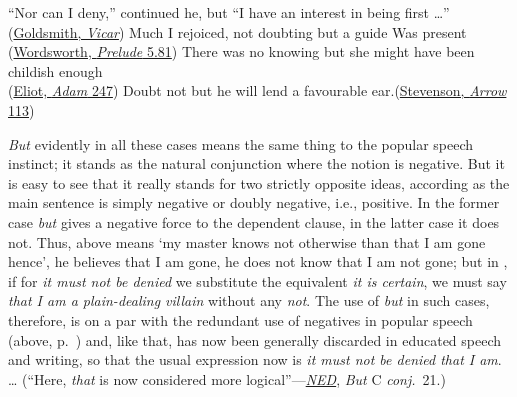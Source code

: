 \ex
``Nor can I deny,'' continued he, but ``I have an interest in being first \dots''\\\hfill(\href{https://archive.org/details/TheVicarOfWakefield/page/n111/mode/2up?q=%22can+I+deny%22&view=theater}{Goldsmith, \textit{Vicar}}) %
\ex
Much I rejoiced, not doubting but a guide Was present\\\hfill(\href{https://en.wikisource.org/wiki/Page%3AThe_Prelude%2C_Wordsworth%2C_1850.djvu/132}{Wordsworth, \textit{Prelude} 5.81})
\ex
There was no knowing but she might have been childish enough\\\hfill(\href{https://archive.org/details/adambede00eliouoft/page/n263/mode/2up?q=%22knowing+but+she+might%22&view=theater}{Eliot, \textit{Adam} 247})
\ex
Doubt not but he will lend a favourable ear.\hfill(\href{https://archive.org/details/blackarrowtaleof00stevrich/page/98/mode/2up?view=theater&q=%22doubt+not+but+he+will%22}{Stevenson, \textit{Arrow} 113})
\z
\z

\textit{But} evidently in all these cases means the same thing to the popular speech instinct; it stands as the natural conjunction where the notion is negative. But it is easy to see that it really stands for two strictly opposite ideas, according as the main sentence is simply negative or doubly negative, i.e., positive. In the former case \textit{but} gives a negative force to the dependent clause, in the latter case it does not. Thus,  above means `my master knows not otherwise than that I am gone hence', he believes that I am gone, he does not know that I am not gone; but in , if for \textit{it must not be denied} we substitute the equivalent \textit{it is certain}, we must say \textit{that I am a plain-dealing villain} without any \textit{not}. The use of \textit{but} in such cases, therefore, is on a par with the redundant use of negatives in popular speech (above, p.~\pageref{paratactic}) and, like that, has now been generally discarded in educated speech and writing, so that the usual expression now is \textit{it must not be denied that I am}. {\dots} (``Here, \textit{that} is now considered more logical''---\href{https://archive.org/details/in.ernet.dli.2015.211152/page/n1239/mode/2up?view=theater}{\textit{NED}}, \textit{But} C \textit{conj.}~21.)

